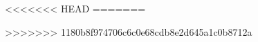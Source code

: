 \newcommand\COURSE{ciss245}
\newcommand\ASSESSMENT{7}
\newcommand\ASSESSMENTTYPE{Assignment}
\newcommand\POINTS{	textwhite{xxx/xxx}}


    


\renewcommand\EMAIL{}

<<<<<<< HEAD
=======
\usepackage{import}
>>>>>>> 1180b8f974706c6c0e68cdb8e2d645a1c0b8712a
\textwidth=6in


    
    

\makeindex

\topmatter
    